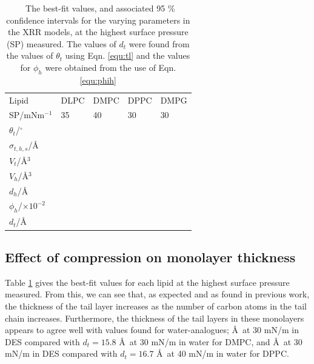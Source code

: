 \documentclass[twoside,twocolumn,9pt]{article}
\begin{document}
\begin{table}
	\small
	\caption{\ The best-fit values, and associated 95 \% confidence intervals for the varying parameters in the XRR models, at the highest surface pressure (SP) measured. The values of $d_t$ were found from the values of $\theta_t$ using Eqn. \ref{equ:tl} and the values for $\phi_h$ were obtained from the use of Eqn. \ref{equ:phih}}
	\label{tab:liptab}
	\begin{tabular*}{0.48\textwidth}{@{\extracolsep{\fill}}lllll}
		\hline
		Lipid & DLPC & DMPC & DPPC & DMPG \\
    SP/mNm$^{-1}$ & 35 & 40 & 30 & 30 \\
		\hline
		$\theta_t$/$^\circ$ &  &  &  &  \\
		$\sigma_{t,h,s}$/\AA &  &  &  &  \\
    \hline
    $V_t$/\AA$^3$ &  &  &  &  \\
		$V_h$/\AA$^3$ &  &  &  &  \\
		$d_h$/\AA &  &  &  &  \\
    \hline
    $\phi_h$/$\times10^{-2}$ &  &  &  &  \\
		$d_t$/\AA &  &  &  &  \\
		\hline
	\end{tabular*}
\end{table}
%

\subsection{Effect of compression on monolayer thickness}
Table \ref{tab:liptab} gives the best-fit values for each lipid at the highest surface pressure measured. From this, we can see that, as expected and as found in previous work,\cite{Mohwald1990,Vaknin1991} the thickness of the tail layer increases as the number of carbon atoms in the tail chain increases. Furthermore, the thickness of the tail layers in these monolayers appears to agree well with values found for water-analogues; \AA\ at 30 mN/m in DES compared with $d_t=15.8$ \AA\ at 30 mN/m\cite{Johnson1991} in water for DMPC, and \AA\ at 30 mN/m in DES compared with $d_t=16.7$ \AA\ at 40 mN/m\cite{Helm1987} in water for DPPC.
\end{document}
